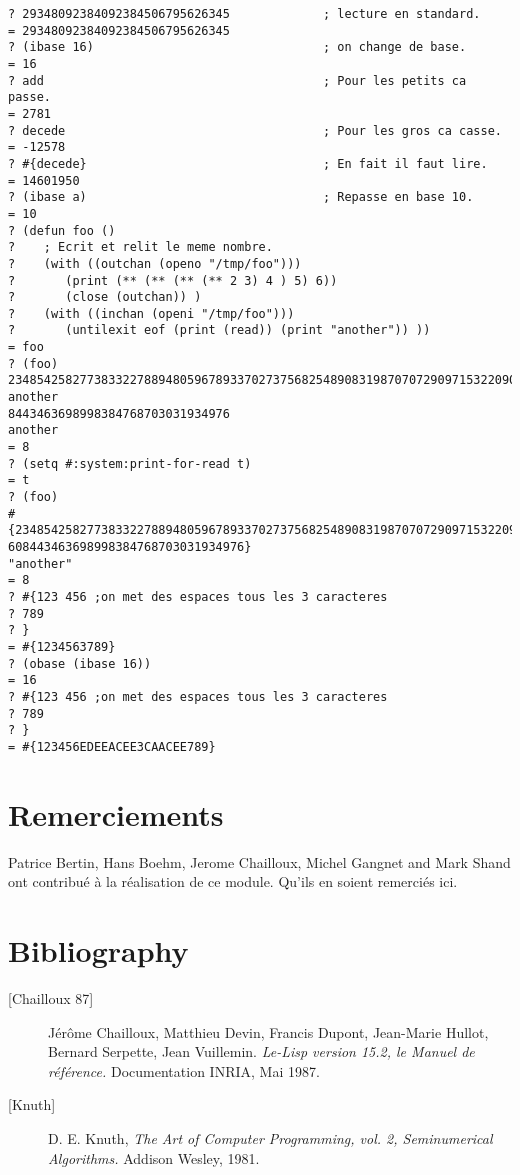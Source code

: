 \begin{verbatim}
? 29348092384092384506795626345             ; lecture en standard.
= 29348092384092384506795626345
? (ibase 16)                                ; on change de base.
= 16
? add                                       ; Pour les petits ca passe.
= 2781
? decede                                    ; Pour les gros ca casse.
= -12578
? #{decede}                                 ; En fait il faut lire.
= 14601950
? (ibase a)                                 ; Repasse en base 10.
= 10
? (defun foo ()
?    ; Ecrit et relit le meme nombre.
?    (with ((outchan (openo "/tmp/foo")))
?       (print (** (** (** (** 2 3) 4 ) 5) 6))
?       (close (outchan)) )
?    (with ((inchan (openi "/tmp/foo")))
?       (untilexit eof (print (read)) (print "another")) ))
= foo
? (foo)
234854258277383322788948059678933702737568254890831987070729097153220902511460
another
8443463698998384768703031934976
another
= 8
? (setq #:system:print-for-read t)
= t
? (foo)
#{2348542582773833227889480596789337027375682548908319870707290971532209025114
608443463698998384768703031934976}
"another"
= 8
? #{123 456 ;on met des espaces tous les 3 caracteres
? 789
? }
= #{1234563789}
? (obase (ibase 16))
= 16
? #{123 456 ;on met des espaces tous les 3 caracteres
? 789
? }
= #{123456EDEEACEE3CAACEE789}
\end{verbatim}

\newpage

\section{Remerciements}
Patrice Bertin, Hans Boehm, Jerome Chailloux, Michel Gangnet and Mark Shand
ont contribu\'e \`a la
r\'ealisation de ce module. Qu'ils en soient remerci\'es ici.

\section{Bibliography}

\begin{description}

\item [{[Chailloux 87]}]
J\'er\^ome Chailloux, Matthieu Devin, Francis Dupont, Jean-Marie Hullot, Bernard Serpette, Jean Vuillemin.
{\em Le-Lisp version 15.2, le Manuel de r\'ef\'erence.}
Documentation INRIA, Mai 1987.

\item [{[Knuth]}]
D. E. Knuth,
{\em The Art of Computer Programming, vol. 2, Seminumerical Algorithms.}
Addison Wesley, 1981.

\end{description}

